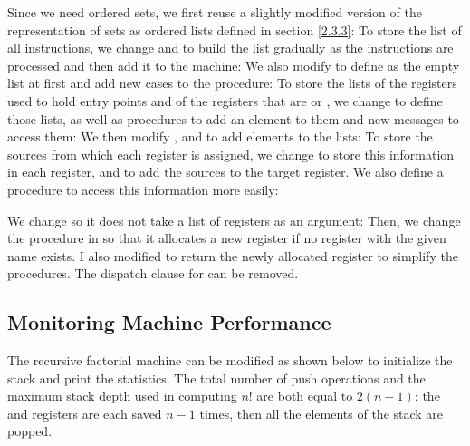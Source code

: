 \begin{exe}[5.12]
    \label{5.12}
    Since we need ordered sets, we first reuse a slightly modified version of 
    the representation of sets as ordered lists defined in section \ref{2.3.3}:
    To store the list of all instructions, we change  and 
     to build the list gradually as the instructions are 
    processed and then add it to the machine:
    We also modify  to define  as 
    the empty list at first and add new cases to the  procedure:
    To store the lists of the registers used to hold entry points and of the 
    registers that are  or , we change 
     to define those lists, as well as procedures to add 
    an element to them and new messages to access them:
    We then modify ,  and  to 
    add elements to the lists:
    To store the sources from which each register is assigned, we change 
     to store this information in each register, and 
     to add the sources to the target register. We also define 
    a  procedure to access this information more easily:
\end{exe}

\begin{exe}[5.13]
    We change  so it does not take a list of registers as an 
    argument:
    Then, we change the  procedure in 
     so that it allocates a new register if no register 
    with the given name exists. I also modified  to 
    return the newly allocated register to simplify the procedures. The dispatch 
    clause for  can be removed.
\end{exe}

\subsection{Monitoring Machine Performance}

\begin{exe}[5.14]
    The recursive factorial machine can be modified as shown below to initialize 
    the stack and print the statistics.
    The total number of push operations and the maximum stack depth used in 
    computing $n!$ are both equal to $2 (n - 1)$: the  and 
     registers are each saved $n - 1$ times, then all the 
    elements of the stack are popped.
\end{exe}

